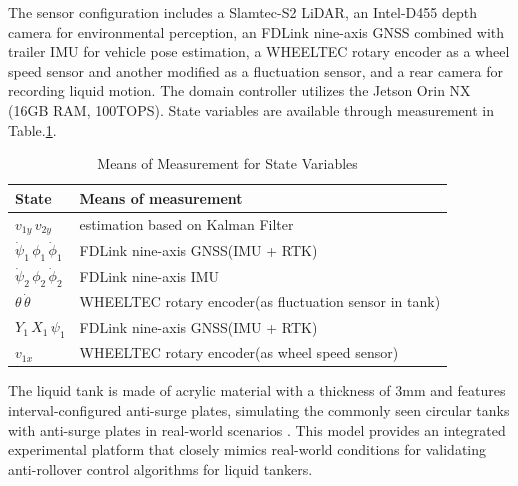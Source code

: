 The sensor configuration includes a Slamtec-S2 LiDAR, an Intel-D455 depth camera for environmental perception, an FDLink nine-axis GNSS combined with trailer IMU for vehicle pose estimation, a WHEELTEC rotary encoder as a wheel speed sensor and another modified as a fluctuation sensor, and a rear camera for recording liquid motion. The domain controller utilizes the Jetson Orin NX (16GB RAM, 100TOPS). State variables are available through measurement in Table.\ref{tab:measurement}.

\vspace{-0.5cm}
\begin{table}[!htbp]
  \centering
  \caption{Means of Measurement for State Variables}
  \vspace{-0.2cm}
  \label{tab:measurement}
  \begin{tabularx}{0.45\textwidth}{@{}lX@{}}
    \toprule
    \textbf{State} & \textbf{Means of measurement} \\
    \midrule
    $v_{1y}\,v_{2y}$ & estimation based on Kalman Filter\cite{FengRan2018}\\
    $\dot{\psi}_1\,\phi_1\,\dot{\phi}_1$ & FDLink nine-axis GNSS(IMU + RTK) \\
    $\dot{\psi}_2\,\phi_2\,\dot{\phi}_2$ & FDLink nine-axis IMU \\
    $\theta\,\dot{\theta}$ & WHEELTEC rotary encoder(as fluctuation sensor in tank)\\
    $Y_1\,X_1\,\psi_1$ & FDLink nine-axis GNSS(IMU + RTK) \\
    $v_{1x}$ & WHEELTEC rotary encoder(as wheel speed sensor) \\
    \bottomrule
  \end{tabularx}
  \vspace{-0.3cm}
\end{table}


The liquid tank is made of acrylic material with a thickness of 3mm and features interval-configured anti-surge plates, simulating the commonly seen circular tanks with anti-surge plates in real-world scenarios \cite{WanYing2018}. This model provides an integrated experimental platform that closely mimics real-world conditions for validating anti-rollover control algorithms for liquid tankers.

